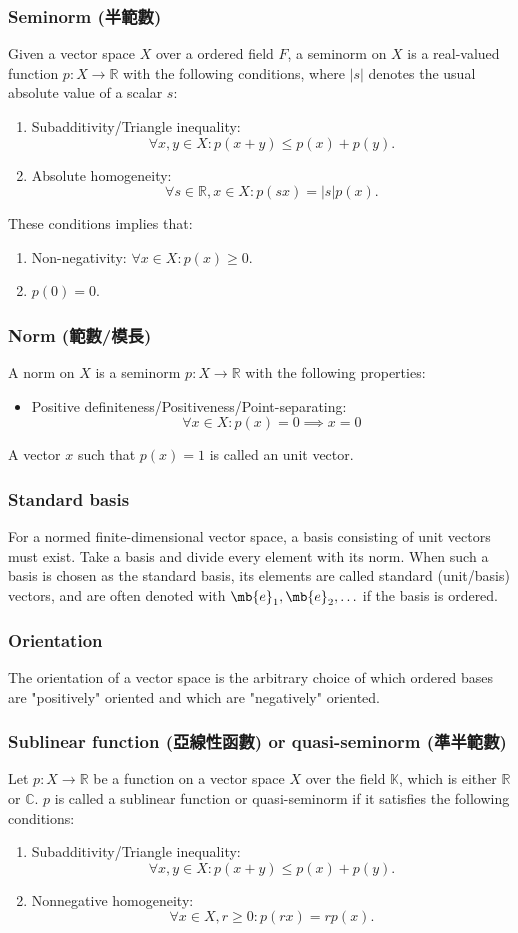 \documentclass[a4paper,12pt]{report}
\begin{document}
\subsubsection{Seminorm (半範數)}
Given a vector space $X$ over a ordered field $F$, a seminorm on $X$ is a real-valued function $p\colon X\to\mathbb{R}$ with the following conditions, where $|s|$ denotes the usual absolute value of a scalar $s$:
\begin{enumerate}
\item Subadditivity/Triangle inequality:\[\forall x,y\in X\colon p(x+y)\leq p(x)+p(y).\]
\item Absolute homogeneity: \[\forall s\in\mathbb{R},x\in X\colon p(sx)=|s|p(x).\]
\end{enumerate}
These conditions implies that:
\begin{enumerate}
\item Non-negativity: $\forall x\in X\colon p(x)\geq 0$.
\item $p(0)=0$.
\end{enumerate}
\subsubsection{Norm (範數/模長)}
A norm on $X$ is a seminorm $p\colon X\to\mathbb{R}$ with the following properties:
\begin{itemize}
\item Positive definiteness/Positiveness/Point-separating: \[\forall x\in X\colon p(x)=0\implies x=0\]
\end{itemize}
A vector $x$ such that $p(x)=1$ is called an unit vector.
\subsubsection{Standard basis}
For a normed finite-dimensional vector space, a basis consisting of unit vectors must exist.
\bpr
Take a basis and divide every element with its norm.
\epr
When such a basis is chosen as the standard basis, its elements are called standard (unit/basis) vectors, and are often denoted with $\mb{e}_1,\mb{e}_2,\ldots$ if the basis is ordered.
\subsubsection{Orientation}
The orientation of a vector space is the arbitrary choice of which ordered bases are "positively" oriented and which are "negatively" oriented.
\subsubsection{Sublinear function (亞線性函數) or quasi-seminorm (準半範數)}
Let $p\colon X\to\mathbb{R}$ be a function on a vector space $X$ over the field $\mathbb{K}$, which is either $\mathbb{R}$ or $\mathbb{C}$. $p$ is called a sublinear function or quasi-seminorm if it satisfies the following conditions:
\begin{enumerate}
\item Subadditivity/Triangle inequality:\[\forall x,y\in X\colon p(x+y)\leq p(x)+p(y).\]
\item Nonnegative homogeneity: \[\forall x\in X,r\geq 0\colon p(rx)=rp(x).\]
\end{enumerate}
\end{document}
